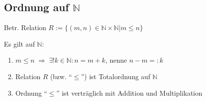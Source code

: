 \subsection*{Ordnung auf $\boldsymbol{\mathbb{N}}$}
\begin{definition}
	Betr. Relation $R:=\{(m,n) \in\mathbb{N}\times\mathbb{N}|m \le n\}$
\end{definition}
\begin{proposition}
	Es gilt auf $\mathbb{N}$:
	\begin{enumerate}[label={\arabic*)}]
		\item $m\le n \;\Rightarrow \;\exists!k\in\mathbb{N}: n = m + k$, nenne $n - m=:k$ 
		\item Relation $R$ (bzw. "`$\le$"') ist Totalordnung auf $\mathbb{N}$
		\item Ordnung "`$\leq$"' ist verträglich mit Addition und Multiplikation
	\end{enumerate}
\end{proposition}